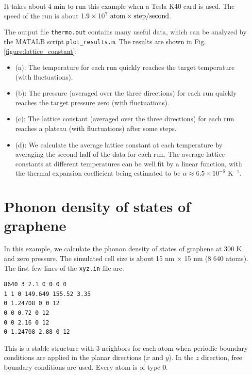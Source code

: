 \documentclass[12pt,a4paper]{report}
\begin{document}
It takes about 4 min to run this example when a Tesla K40 card is used. The speed of the run is about $1.9 \times 10^7 ~\textmd{atom} \times \textmd{step} / \textmd{second}$.

The output file \verb"thermo.out" contains many useful data, which can be analyzed by the MATALB script \verb"plot_results.m". The results are shown in Fig. \ref{figure:lattice_constant}:
\begin{itemize}
\item (a): The temperature for each run quickly reaches the target temperature (with fluctuations).
\item (b): The pressure (averaged over the three directions) for each run quickly reaches the target pressure zero (with fluctuations).
\item (c): The lattice constant (averaged over the three directions) for each run reaches a plateau (with fluctuations) after some steps.
\item (d): We calculate the average lattice constant at each temperature by averaging the second half of the data for each run. The average lattice constants at different temperatures can be well fit by a linear function, with the thermal expansion coefficient being estimated to be $\alpha \approx 6.5\times10^{-6}$ K$^{-1}$.
\end{itemize}


\section{Phonon density of states of graphene}


In this example, we calculate the phonon density of states of graphene at 300 K
and zero pressure. The simulated cell size is about 15 nm $\times$ 15 nm (8 640 atoms).
The first few lines of the \verb"xyz.in" file are:
\begin{verbatim}
8640 3 2.1 0 0 0 0
1 1 0 149.649 155.52 3.35
0 1.24708 0 0 12
0 0 0.72 0 12
0 0 2.16 0 12
0 1.24708 2.88 0 12
\end{verbatim}
This is a stable structure with 3 neighbors for each atom when periodic boundary conditions are applied in the planar directions ($x$ and $y$). In the $z$ direction, free boundary conditions are used. Every atom is of type 0.
\end{document}
